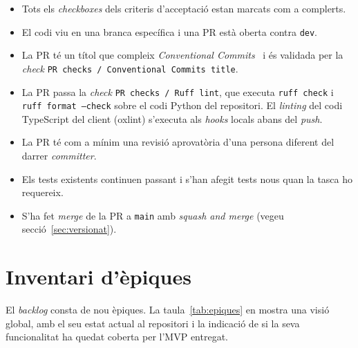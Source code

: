 \begin{itemize}
    \item Tots els \emph{checkboxes} dels criteris d'acceptació estan marcats com a complerts.

    \item El codi viu en una branca específica i una \ac{PR} està oberta contra \texttt{dev}.

    \item La \ac{PR} té un títol que compleix \emph{Conventional Commits}~\cite{conventionalcommits} i és validada per
    la \emph{check} \texttt{PR checks / Conventional Commits title}.

    \item La \ac{PR} passa la \emph{check} \texttt{PR checks / Ruff lint}, que executa \texttt{ruff check} i
    \texttt{ruff format --check} sobre el codi Python del repositori.
    El \emph{linting} del codi TypeScript del client (oxlint) s'executa als \emph{hooks} locals abans del \emph{push}.

    \item La \ac{PR} té com a mínim una revisió aprovatòria d'una persona diferent del darrer \emph{committer}.

    \item Els tests existents continuen passant i s'han afegit tests nous quan la tasca ho requereix.

    \item S'ha fet \textit{merge} de la \ac{PR} a \texttt{main} amb \emph{squash and merge} (vegeu
    secció~\ref{sec:versionat}).
\end{itemize}



\section{Inventari d'èpiques}
\label{sec:epiques}

El \emph{backlog} consta de nou èpiques.
La taula~\ref{tab:epiques} en mostra una visió global, amb el seu estat actual al repositori i la indicació de si la
seva funcionalitat ha quedat coberta per l'\ac{MVP} entregat.

